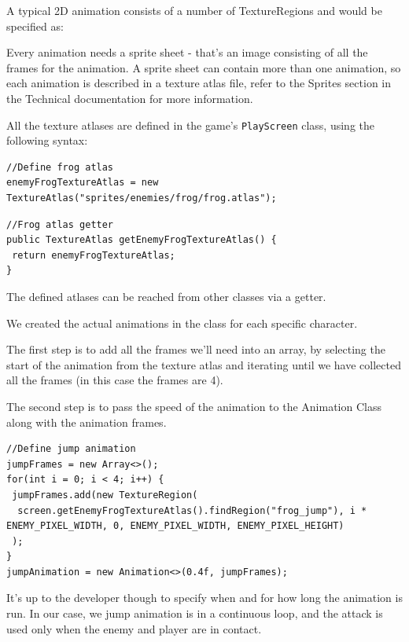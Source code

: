 \documentclass[12p]{article}
\begin{document}
A typical 2D animation consists of a number of TextureRegions and would be specified as:


Every animation needs a sprite sheet - that's an image consisting of all the frames for the animation. A sprite sheet can contain more than one animation, so each animation is described in a texture atlas file, refer to the Sprites section in the Technical documentation for more information. 

All the texture atlases are defined in the game's \texttt{PlayScreen} class, using the following syntax:

\begin{verbatim}
//Define frog atlas
enemyFrogTextureAtlas = new TextureAtlas("sprites/enemies/frog/frog.atlas");
\end{verbatim}

\begin{verbatim}
//Frog atlas getter
public TextureAtlas getEnemyFrogTextureAtlas() {
 return enemyFrogTextureAtlas;
}
\end{verbatim}

The defined atlases can be reached from other classes via a getter.

We created the actual animations in the class for each specific character. 

The first step is to add all the frames we'll need into an array, by selecting the start of the animation from the texture atlas and iterating until we have collected all the frames (in this case the frames are 4).

The second step is to pass the speed of the animation to the Animation Class along with the animation frames.

\begin{verbatim}
//Define jump animation
jumpFrames = new Array<>();
for(int i = 0; i < 4; i++) {
 jumpFrames.add(new TextureRegion(
  screen.getEnemyFrogTextureAtlas().findRegion("frog_jump"), i * ENEMY_PIXEL_WIDTH, 0, ENEMY_PIXEL_WIDTH, ENEMY_PIXEL_HEIGHT)
 );
}
jumpAnimation = new Animation<>(0.4f, jumpFrames);
\end{verbatim}

It's up to the developer though to specify when and for how long the animation is run. In our case, we jump animation is in a continuous loop, and the attack is used only when the enemy and player are in contact.
\end{document}
